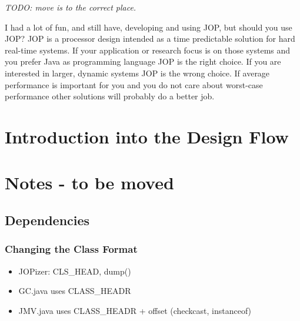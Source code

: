 \emph{TODO: move is to the correct place.}

I had a lot of fun, and still have, developing and using JOP, but
should you use JOP? JOP is a processor design intended as a time
predictable solution for hard real-time systems. If your application
or research focus is on those systems and you prefer Java as
programming language JOP is the right choice. If you are interested
in larger, dynamic systems JOP is the wrong choice. If average
performance is important for you and you do not care about
worst-case performance other solutions will probably do a better
job.




\chapter{Introduction into the Design Flow}
\label{chap:build}




\chapter{Notes - to be moved}

\section{Dependencies}

\subsection{Changing the Class Format}

\begin{itemize}
    \item JOPizer: CLS\_HEAD, dump()
    \item GC.java uses CLASS\_HEADR
    \item JMV.java uses CLASS\_HEADR + offset (checkcast, instanceof)
\end{itemize}




\appendix

